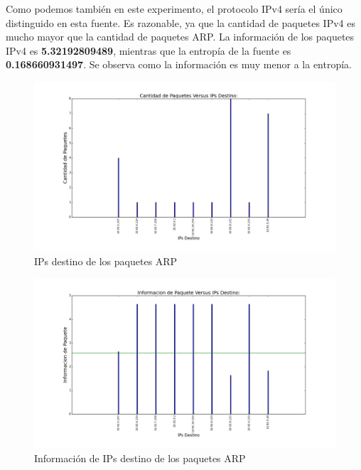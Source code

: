 Como podemos también en este experimento, el protocolo IPv4 sería el único distinguido en esta fuente. Es razonable, ya que la cantidad de paquetes IPv4 es mucho mayor que la cantidad de paquetes ARP. La información de los paquetes IPv4 es \textbf{5.32192809489}, mientras que la entropía de la fuente es \textbf{0.168660931497}. Se observa como la información es muy menor a la entropía.

\begin{figure}[H]
       \centering
       \includegraphics[width=1\textwidth]{../resultados/subte/histogram_dst.png}
       \caption{IPs destino de los paquetes ARP}
       \label{red-Starbucks-dst}
\end{figure}

\begin{figure}[H]
       \centering
       \includegraphics[width=1\textwidth]{../resultados/subte/histogram_dst_information.png}
       \caption{Información de IPs destino de los paquetes ARP}
       \label{red-Starbucks-dst-information}
\end{figure}

